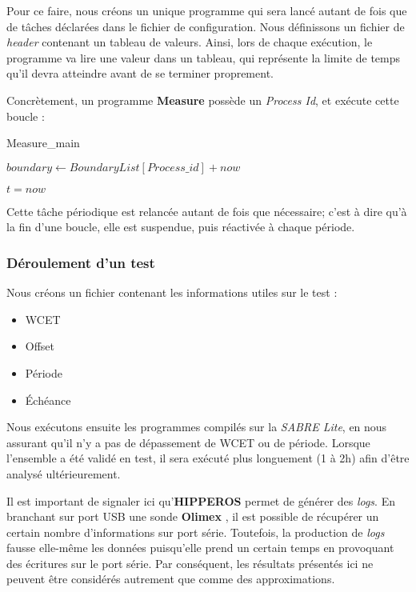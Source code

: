 	Pour ce faire, nous créons un unique programme qui sera lancé autant de fois que de tâches déclarées 
	dans le fichier de configuration. 
	Nous définissons un fichier de \textit{header} contenant un tableau de valeurs. 
	Ainsi, lors de chaque exécution, le programme va lire une valeur dans un tableau, qui représente la 
	limite de temps qu'il devra atteindre avant de se terminer proprement.\newline
	
	Concrètement, un programme \textbf{Measure} possède un \textit{Process Id}, et exécute cette boucle :

	\label{algomeasure}
	\begin{algorithm}[H]
		\caption{Measure\_main}
		\begin{algorithmic}
			\STATE $boundary \leftarrow BoundaryList[Process\_id] + now$
			\REPEAT \item $t = now$
		\end{algorithmic}
	\end{algorithm}

	Cette tâche périodique est relancée autant de fois que nécessaire; c'est à dire qu'à la fin 
	d'une boucle, elle est suspendue, puis réactivée à chaque période.
	
	\subsubsection{Déroulement d'un test}
	Nous créons un fichier contenant les informations utiles sur le test :
	\begin{itemize}
		\item WCET
		\item Offset
		\item Période
		\item Échéance
	\end{itemize}
	Nous exécutons ensuite les programmes compilés sur la \textit{SABRE Lite}, en nous assurant qu'il n'y a pas 
	de dépassement de WCET ou de période. Lorsque l'ensemble a été validé en test, il sera 
	exécuté plus longuement (1 à 2h) afin d'être analysé ultérieurement.\newline

	Il est important de signaler ici qu'\textbf{HIPPEROS} permet de générer des \textit{logs}.
	En branchant sur port USB une sonde \textbf{Olimex} , il est possible de récupérer 
	un certain nombre d'informations sur port série. Toutefois, la production de \textit{logs}
	fausse elle-même les données puisqu'elle prend un certain temps en provoquant des écritures 
	sur le port série.
	Par conséquent, les résultats présentés ici ne peuvent 
	être considérés autrement que comme des approximations.

